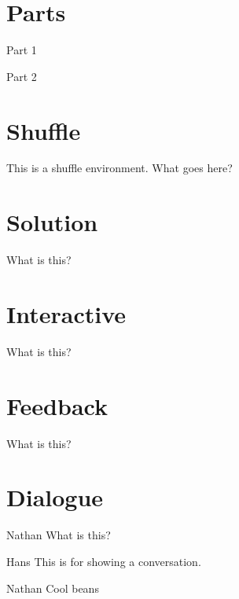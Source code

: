 \documentclass{ximera}
\begin{document}
\section{Parts}

\begin{parts}
\item Part 1
\item Part 2
\end{parts}



\section{Shuffle}

\begin{shuffle}
This is a shuffle environment. What goes here?
\end{shuffle}



\section{Solution}

\begin{solution}
What is this?
\end{solution}



\section{Interactive}

\begin{interactive}
What is this?
\end{interactive}



\section{Feedback}

\begin{feedback}
What is this?
\end{feedback}



\section{Dialogue}

\begin{dialogue}
\item[Nathan] What is this?
\item[Hans] This is for showing a conversation.
\item[Nathan] Cool beans
\end{dialogue}
\end{document}
